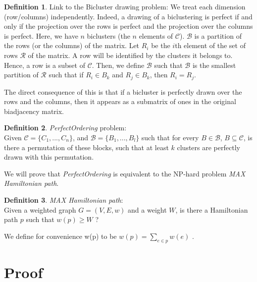 \documentclass[twoside,leqno,twocolumn]{article}
\theoremstyle{definition}
\newtheorem{definition}{Definition}[section]
\begin{document}
\begin{definition}
Link to the Bicluster drawing problem: \newline
We treat each dimension (row/columns) independently. Indeed, a drawing of a biclustering is perfect if and only if the projection over the rows is perfect and the projection over the columns is perfect. \newline
Here, we have $n$ biclusters (the $n$ elements of $\mathcal{C}$). $\mathcal{B}$ is a partition of the rows (or the columns) of the matrix. Let $R_i$ be the $i$th element of the set of rows $\mathcal{R}$ of the matrix. A row will be identified by the clusters it belongs to. Hence, a row is a subset of $\mathcal{C}$. Then, we define $\mathcal{B}$ such that $\mathcal{B}$ is the smallest partition of $\mathcal{R}$ such that if $R_i \in B_k$ and $R_j \in B_k$, then $R_i = R_j$.
\end{definition}

\noindent The direct consequence of this is that if a bicluster is perfectly drawn over the rows and the columns, then it appears as a submatrix of ones in the original biadjacency matrix.

\begin{definition}
        \textit{PerfectOrdering} problem:\\
Given $\mathcal{C} = \{C_1,...,C_n\}$, and $\mathcal{B} = \{B_1,...,B_{l}\}$ such that for every $B \in \mathcal{B}$, $B\subseteq \mathcal{C}$, is there a permutation of these blocks, such that at least $k$ clusters are perfectly drawn with this permutation.
\end{definition}

\medskip

\noindent We will prove that \textit{PerfectOrdering} is equivalent to the NP-hard problem \textit{MAX Hamiltonian path}.


\begin{definition}
\textit{MAX Hamiltonian path}:\\
Given a weighted graph $G = (V,E,w)$ and a weight $W$, is there a Hamiltonian path $p$ such that  
$w(p) \geq W$ ?
\end{definition}



\medskip

\noindent We define for convenience w(p) to be $w(p) = \sum_{e\in p}w(e)$ .%

\bigskip


\section*{Proof}
\end{document}
